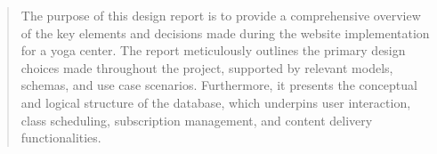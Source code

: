 \begin{abstract}
    The purpose of this design report is to provide a comprehensive overview of the key elements and decisions made
    during the website implementation for a yoga center. The report meticulously outlines the primary design choices
    made throughout the project, supported by relevant models, schemas, and use case scenarios. Furthermore,
    it presents the conceptual and logical structure of the database, which underpins user interaction,
    class scheduling, subscription management, and content delivery functionalities.
\end{abstract}